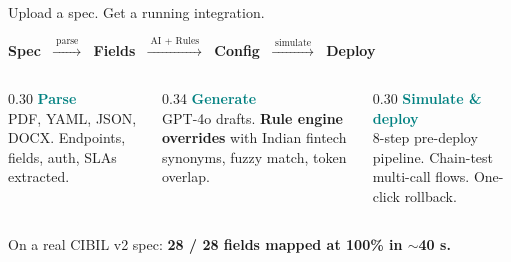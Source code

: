\documentclass[aspectratio=169,11pt]{beamer}
\begin{document}
\begin{frame}{Upload a spec. Get a running integration.}
\vspace{0.3em}
\begin{center}
{\large
\textbf{Spec} $\;\xrightarrow{\;\text{parse}\;}\;$ \textbf{Fields} $\;\xrightarrow{\;\text{AI + Rules}\;}\;$ \textbf{Config} $\;\xrightarrow{\;\text{simulate}\;}\;$ \textbf{Deploy}
}
\end{center}

\vspace{0.8em}
\begin{columns}[T]
\begin{column}{0.30\textwidth}
\textbf{\textcolor{teal}{Parse}}\\
{\small PDF, YAML, JSON, DOCX. Endpoints, fields, auth, SLAs extracted.}
\end{column}
\begin{column}{0.34\textwidth}
\textbf{\textcolor{teal}{Generate}}\\
{\small GPT-4o drafts. \textbf{Rule engine overrides} with Indian fintech synonyms, fuzzy match, token overlap.}
\end{column}
\begin{column}{0.30\textwidth}
\textbf{\textcolor{teal}{Simulate \& deploy}}\\
{\small 8-step pre-deploy pipeline. Chain-test multi-call flows. One-click rollback.}
\end{column}
\end{columns}

\vspace{0.8em}
\begin{center}
{\Large On a real CIBIL v2 spec: \textcolor{ok}{\textbf{28 / 28 fields mapped at 100\% in $\sim$40 s.}}}
\end{center}
\end{frame}
\end{document}
